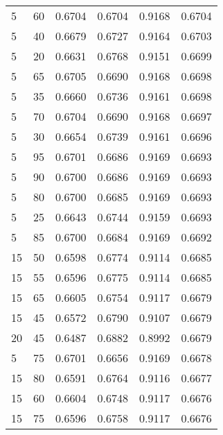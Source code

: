 \begin{center}
\begin{longtable}{|l|l|l|l|l|l|}
5                 & 60                & 0.6704    & 0.6704 & 0.9168      & 0.6704    \\
5                 & 40                & 0.6679    & 0.6727 & 0.9164      & 0.6703    \\
5                 & 20                & 0.6631    & 0.6768 & 0.9151      & 0.6699    \\
5                 & 65                & 0.6705    & 0.6690 & 0.9168      & 0.6698    \\
5                 & 35                & 0.6660    & 0.6736 & 0.9161      & 0.6698    \\
5                 & 70                & 0.6704    & 0.6690 & 0.9168      & 0.6697    \\
5                 & 30                & 0.6654    & 0.6739 & 0.9161      & 0.6696    \\
5                 & 95                & 0.6701    & 0.6686 & 0.9169      & 0.6693    \\
5                 & 90                & 0.6700    & 0.6686 & 0.9169      & 0.6693    \\
5                 & 80                & 0.6700    & 0.6685 & 0.9169      & 0.6693    \\
5                 & 25                & 0.6643    & 0.6744 & 0.9159      & 0.6693    \\
5                 & 85                & 0.6700    & 0.6684 & 0.9169      & 0.6692    \\
15                & 50                & 0.6598    & 0.6774 & 0.9114      & 0.6685    \\
15                & 55                & 0.6596    & 0.6775 & 0.9114      & 0.6685    \\
15                & 65                & 0.6605    & 0.6754 & 0.9117      & 0.6679    \\
15                & 45                & 0.6572    & 0.6790 & 0.9107      & 0.6679    \\
20                & 45                & 0.6487    & 0.6882 & 0.8992      & 0.6679    \\
5                 & 75                & 0.6701    & 0.6656 & 0.9169      & 0.6678    \\
15                & 80                & 0.6591    & 0.6764 & 0.9116      & 0.6677    \\
15                & 60                & 0.6604    & 0.6748 & 0.9117      & 0.6676    \\
15                & 75                & 0.6596    & 0.6758 & 0.9117      & 0.6676    \\

\end{longtable}
\end{center}
